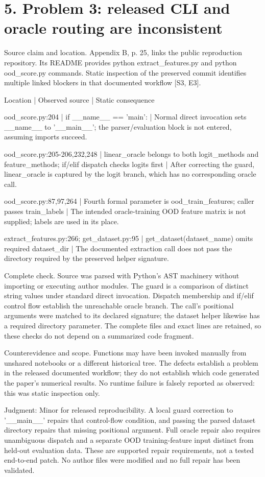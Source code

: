 \documentclass[10pt]{article}
\begin{document}
\section*{5. Problem 3: released CLI and oracle routing are inconsistent}
Source claim and location. Appendix B, p. 25, links the public reproduction repository. Its README provides python extract\_features.py and python ood\_score.py commands. Static inspection of the preserved commit identifies multiple linked blockers in that documented workflow [S3, E3].\par
Location | Observed source | Static consequence\par
ood\_score.py:204 | if \_\_name\_\_ == ’main’: | Normal direct invocation sets \_\_name\_\_ to ’\_\_main\_\_’; the parser/evaluation block is not entered, assuming imports succeed.\par
ood\_score.py:205-206,232,248 | linear\_oracle belongs to both logit\_methods and feature\_methods; if/elif dispatch checks logits first | After correcting the guard, linear\_oracle is captured by the logit branch, which has no corresponding oracle call.\par
ood\_score.py:87,97,264 | Fourth formal parameter is ood\_train\_features; caller passes train\_labels | The intended oracle-training OOD feature matrix is not supplied; labels are used in its place.\par
extract\_features.py:266; get\_dataset.py:95 | get\_dataset(dataset\_name) omits required dataset\_dir | The documented extraction call does not pass the directory required by the preserved helper signature.\par
Complete check. Source was parsed with Python’s AST machinery without importing or executing author modules. The guard is a comparison of distinct string values under standard direct invocation. Dispatch membership and if/elif control flow establish the unreachable oracle branch. The call’s positional arguments were matched to its declared signature; the dataset helper likewise has a required directory parameter. The complete files and exact lines are retained, so these checks do not depend on a summarized code fragment.\par
Counterevidence and scope. Functions may have been invoked manually from unshared notebooks or a different historical tree. The defects establish a problem in the released documented workflow; they do not establish which code generated the paper’s numerical results. No runtime failure is falsely reported as observed: this was static inspection only.\par
Judgment: Minor for released reproducibility. A local guard correction to ’\_\_main\_\_’ repairs that control-flow condition, and passing the parsed dataset directory repairs that missing positional argument. Full oracle repair also requires unambiguous dispatch and a separate OOD training-feature input distinct from held-out evaluation data. These are supported repair requirements, not a tested end-to-end patch. No author files were modified and no full repair has been validated.\par
\end{document}
